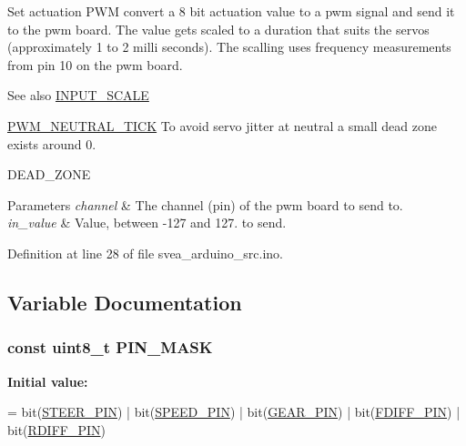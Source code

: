 Set actuation P\+WM convert a 8 bit actuation value to a pwm signal and send it to the pwm board. The value gets scaled to a duration that suits the servos (approximately 1 to 2 milli seconds). The scalling uses frequency measurements from pin 10 on the pwm board. 

\begin{DoxySeeAlso}{See also}
\hyperlink{group__ActuationToOutput_ga8e7323c31db382601e81947c2bba345b}{I\+N\+P\+U\+T\+\_\+\+S\+C\+A\+LE} 

\hyperlink{group__ActuationToOutput_gaa6aecad7bb848a436df0b7c89aa1f48f}{P\+W\+M\+\_\+\+N\+E\+U\+T\+R\+A\+L\+\_\+\+T\+I\+CK} To avoid servo jitter at neutral a small dead zone exists around 0. 

D\+E\+A\+D\+\_\+\+Z\+O\+NE 
\end{DoxySeeAlso}

\begin{DoxyParams}{Parameters}
{\em channel} & The channel (pin) of the pwm board to send to. \\
\hline
{\em in\+\_\+value} & Value, between -\/127 and 127. to send. \\
\hline
\end{DoxyParams}


Definition at line 28 of file svea\+\_\+arduino\+\_\+src.\+ino.



\subsection{Variable Documentation}
\subsubsection[{\texorpdfstring{P\+I\+N\+\_\+\+M\+A\+SK}{PIN_MASK}}]{\setlength{\rightskip}{0pt plus 5cm}const uint8\+\_\+t P\+I\+N\+\_\+\+M\+A\+SK}\hypertarget{group__GlobalVariables_ga89098a2ff03e736c257b322e78e7c6e3}{}\label{group__GlobalVariables_ga89098a2ff03e736c257b322e78e7c6e3}
{\bfseries Initial value\+:}
\begin{DoxyCode}
= bit(\hyperlink{group__RecieverPwmPins_ga2a0f80bf9db172cf17bb4b928e861c50}{STEER\_PIN}) 
                       | bit(\hyperlink{group__RecieverPwmPins_gafee863b6234dfd9b3a4d97265e4a9a8a}{SPEED\_PIN})
                       | bit(\hyperlink{group__RecieverPwmPins_gaa1ed2fccc158e7fcb5aab8eb00e39b72}{GEAR\_PIN})
                       | bit(\hyperlink{group__RecieverPwmPins_ga91432e122cb52e765d68aed43104e478}{FDIFF\_PIN})
                       | bit(\hyperlink{group__RecieverPwmPins_ga98a9ce3925b9f576ed03843a3c6c1623}{RDIFF\_PIN})
\end{DoxyCode}


